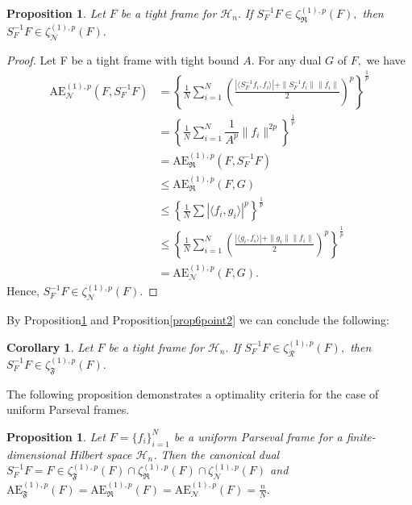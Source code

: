 \documentclass[final,1p,times]{elsarticle}
\newtheorem{prop}[thm]{Proposition}
\newtheorem{cor}[thm]{Corollary}
\begin{document}
\begin{prop}\label{prop6point1}
	Let $F$ be a tight frame for $\mathcal{H}_n.$ If $ S_{F}^{-1}F\in \zeta_{\mathfrak{R}}^{(1),p}(F),$ then $ S_{F}^{-1}F\in \zeta_{\mathcal{N}}^{(1),p}(F).$
	
\end{prop}

\begin{proof}
    Let F be a tight frame with tight bound $A.$ For any dual $G$  of $F,$ we have
\begin{align*}
    \mathrm{AE}_{\mathcal{N}}^{(1),p}(F, S_{F}^{-1}F) &=   \left\{\frac{1}{N} \sum\limits_{i=1}^N\left( \frac{|\langle S_{F}^{-1}f_i,f_i\rangle| + \|S_{F}^{-1}f_i\|\|f_i\|}{2}\right)^p\right\}^{\frac{1}{p}}\\&
    = \left\{\frac{1}{N} \sum\limits_{i=1}^N\dfrac{1}{A^p} \|f_i\|^{2p}\right\}^{\frac{1}{p}} \\&
    = \mathrm{AE}_{\mathfrak{R}}^{(1),p}(F, S_{F}^{-1}F) \\&
    \leq \mathrm{AE}_{\mathfrak{R}}^{(1),p}(F, G) \\&
    \leq \left\{\frac{1}{N} \sum \left|\langle f_i, g_i \rangle \right|^p\right\}^{\frac{1}{p}} \\&
    \leq \left\{\frac{1}{N} \sum\limits_{i=1}^N\left( \frac{|\langle g_i,f_i\rangle| + \|g_i\|\|f_i\|}{2}\right)^p\right\}^{\frac{1}{p}}\\&
    = \mathrm{AE}_{\mathcal{N}}^{(1),p}(F, G).
\end{align*}
 Hence, $ S_{F}^{-1}F\in \zeta_{\mathcal{N}}^{(1),p}(F).$    
  
\end{proof}


    

	
By Proposition\ref{prop6point1} and Proposition\ref{prop6point2} we can conclude the following:
\begin{cor}
	Let $F$ be a tight frame for $\mathcal{H}_n.$ If $ S_{F}^{-1}F\in \zeta_{\mathcal{R}}^{(1),p}(F),$ then  $ S_{F}^{-1}F\in \zeta_{\mathfrak{F}}^{(1),p}(F).$ 
	
\end{cor}

\noindent The following proposition demonstrates a optimality criteria for the case of uniform Parseval frames.

\begin{prop}
Let \( F = \{f_i\}_{i=1}^N \) be a uniform Parseval frame for a finite-dimensional Hilbert space \( \mathcal{H}_n \). Then the canonical dual \(  S_F^{-1}F = F \in \zeta_{\mathfrak{F}}^{(1),p}(F) \cap \zeta_{\mathfrak{R}}^{(1),p}(F) \cap \zeta_{\mathcal{N}}^{(1),p}(F)\)  and
\(
\mathrm{AE}_{\mathfrak{F}}^{(1),p}(F) = \mathrm{AE}_{\mathfrak{R}}^{(1),p}(F) = \mathrm{AE}_{\mathcal{N}}^{(1),p}(F) = \frac{n}{N}.
\)
\end{prop}
\end{document}
